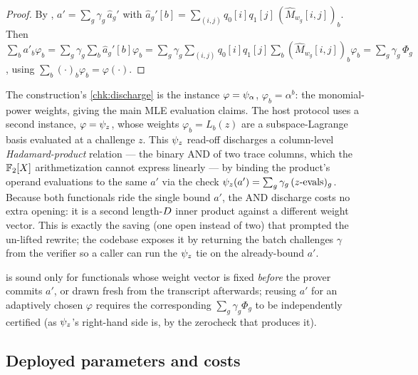 \begin{proof}
By , $a' = \sum_g \gamma_g\,\widehat a_g'$ with
$\widehat a_g'[b] = \sum_{(i,j)} q_0[i]q_1[j]\,(\widehat M_{w_g}[i,j])_b$.
Then $\sum_b a'_b\varphi_b = \sum_g \gamma_g \sum_b
\widehat a_g'[b]\varphi_b = \sum_g \gamma_g \sum_{(i,j)} q_0[i]q_1[j]
\sum_b (\widehat M_{w_g}[i,j])_b\varphi_b = \sum_g \gamma_g\,\Phi_g$,
using $\sum_b (\cdot)_b\varphi_b = \varphi(\cdot)$.
\end{proof}

The construction's \ref{chk:discharge} is the instance $\varphi = \psi_{\alpha}$,
$\varphi_b = \alpha^b$: the monomial-power weights, giving the main MLE
evaluation claims. The host protocol uses a second instance,
$\varphi = \psi_{z}$, whose weights $\varphi_b = L_b(z)$ are a
subspace-Lagrange basis evaluated at a challenge $z$. This $\psi_{z}$
read-off discharges a column-level \emph{Hadamard-product} relation --- the
binary $\mathrm{AND}$ of two trace columns, which the
$\mathbb{F}_2[X]$ arithmetization cannot express linearly --- by binding the
product's operand evaluations to the same $a'$ via the check
$\psi_{z}(a') = \sum_g \gamma_g\,(\text{$z$-evals})_g$. Because both
functionals ride the single bound $a'$, the AND discharge costs no extra
opening: it is a second length-$D$ inner product against a different
weight vector. This is exactly the saving (one open instead of two) that
prompted the un-lifted rewrite; the codebase exposes it by returning the
batch challenges $\gamma$ from the verifier so a caller can run the
$\psi_{z}$ tie on the already-bound $a'$.

\begin{remark}
 is sound only for functionals whose weight vector is
fixed \emph{before} the prover commits $a'$, or drawn fresh from the
transcript afterwards; reusing $a'$ for an adaptively chosen $\varphi$
requires the corresponding $\sum_g\gamma_g\Phi_g$ to be independently
certified (as $\psi_{z}$'s right-hand side is, by the zerocheck that
produces it).
\end{remark}

\subsection{Deployed parameters and costs}

